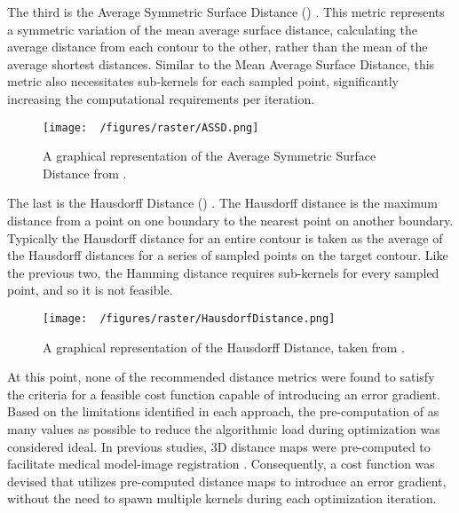 The third is the Average Symmetric Surface Distance () \cite{yeghiazaryanFamilyBoundaryOverlap2018}.
This metric represents a symmetric variation of the mean average surface distance, calculating the average distance from each contour to the other, rather than the mean of the average shortest distances.
Similar to the Mean Average Surface Distance, this metric also necessitates sub-kernels for each sampled point, significantly increasing the computational requirements per iteration.

\begin{figure}[h!]
  \centering
  \texttt{[image: ~/figures/raster/ASSD.png]}
  \caption{A graphical representation of the Average Symmetric Surface Distance from \cite{reinkeUnderstandingMetricrelatedPitfalls2023,reinkeCommonLimitationsImage2023}.}
  \label{fig:ASSD}
\end{figure}

The last is the Hausdorff Distance () \cite{huttenlocherMultiresolutionTechniqueComparing1993,felzenszwalbDistanceTransformsSampled2012,huttenlocherComparingImagesUsing1993}.
The Hausdorff distance is the maximum distance from a point on one boundary to the nearest point on another boundary. Typically the Hausdorff distance for an entire contour is taken as the average of the Hausdorff distances for a series of sampled points on the target contour.
Like the previous two, the Hamming distance requires sub-kernels for every sampled point, and so it is not feasible.


\begin{figure}[h!]
  \centering
  \texttt{[image: ~/figures/raster/HausdorfDistance.png]}
  \caption{A graphical representation of the Hausdorff Distance, taken from \cite{reinkeCommonLimitationsImage2023,reinkeUnderstandingMetricrelatedPitfalls2023}.}
  \label{fig:HD}
\end{figure}

At this point, none of the recommended distance metrics were found to satisfy the criteria for a feasible cost function capable of introducing an error gradient.
Based on the limitations identified in each approach, the pre-computation of as many values as possible to reduce the algorithmic load during optimization was considered ideal.
In previous studies, 3D distance maps were pre-computed to facilitate medical model-image registration \cite{lavalleeRecoveringPositionOrientation1995,zuffiModelbasedMethodReconstruction1999}.
Consequently, a cost function was devised that utilizes pre-computed distance maps to introduce an error gradient, without the need to spawn multiple kernels during each optimization iteration.



